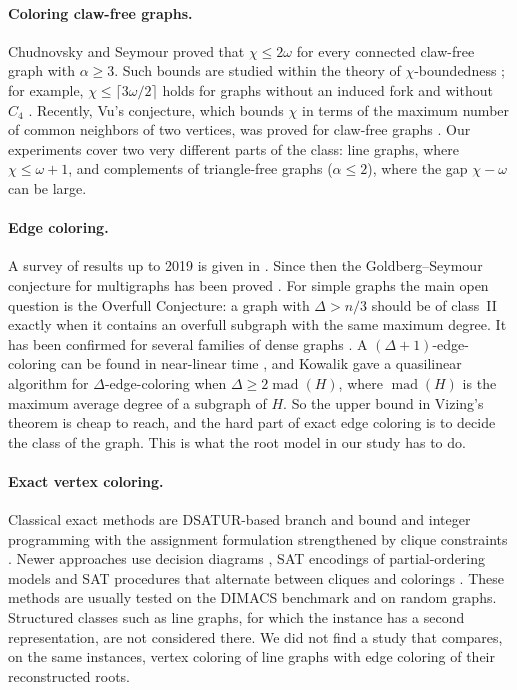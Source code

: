 \documentclass[11pt,a4paper]{article}
\DeclareMathOperator{\mad}{mad}
\begin{document}
\paragraph{Coloring claw-free graphs.}
Chudnovsky and Seymour \cite{chudnovsky2010} proved that $\chi\le 2\omega$ for
every connected claw-free graph with $\alpha\ge 3$. Such bounds are studied
within the theory of $\chi$-boundedness \cite{scott2020}; for example,
$\chi\le\lceil 3\omega/2\rceil$ holds for graphs without an induced fork and
without $C_4$ \cite{chudnovsky2021}. Recently, Vu's conjecture, which bounds
$\chi$ in terms of the maximum number of common neighbors of two vertices,
was proved for claw-free graphs \cite{cook2025}. Our experiments cover two
very different parts of the class: line graphs, where $\chi\le\omega+1$, and
complements of triangle-free graphs ($\alpha\le 2$), where the gap
$\chi-\omega$ can be large.

\paragraph{Edge coloring.}
A survey of results up to 2019 is given in \cite{cao2019}. Since then the
Goldberg--Seymour conjecture for multigraphs has been proved \cite{chen2025}.
For simple graphs the main open question is the Overfull Conjecture: a graph
with $\Delta>n/3$ should be of class~II exactly when it contains an overfull
subgraph with the same maximum degree. It has been confirmed for several
families of dense graphs \cite{cao2022}. A $(\Delta+1)$-edge-coloring can be
found in near-linear time \cite{assadi2025}, and Kowalik \cite{kowalik2024}
gave a quasilinear algorithm for $\Delta$-edge-coloring when
$\Delta\ge 2\mad(H)$, where $\mad(H)$ is the maximum average degree of a
subgraph of $H$. So the upper bound in Vizing's theorem is cheap to reach, and
the hard part of exact edge coloring is to decide the class of the graph. This
is what the root model in our study has to do.

\paragraph{Exact vertex coloring.}
Classical exact methods are DSATUR-based branch and bound
\cite{brelaz1979,sansegundo2012,furini2017} and integer programming with the
assignment formulation strengthened by clique constraints
\cite{mendez2006,malaguti2010}. Newer approaches use decision diagrams
\cite{vanhoeve2022}, SAT encodings of partial-ordering models
\cite{faber2024} and SAT procedures that alternate between cliques and
colorings \cite{heule2022}. These methods are usually tested on the DIMACS
benchmark and on random graphs. Structured classes such as line graphs, for
which the instance has a second representation, are not considered there. We
did not find a study that compares, on the same instances, vertex coloring of
line graphs with edge coloring of their reconstructed roots.
\end{document}
